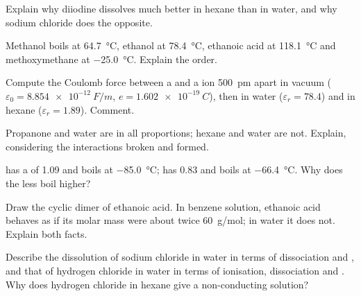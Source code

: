 \begin{exercise}[$\star$]\label{exo:b1:intermolecular-forces-solvents:4}
Explain why diiodine dissolves much better in hexane than in water, and
why sodium chloride does the opposite.
\end{exercise}

\begin{exercise}[$\star\star$]\label{exo:b1:intermolecular-forces-solvents:5}
Methanol boils at \qty{64.7}{\celsius}, ethanol at \qty{78.4}{\celsius},
ethanoic acid at \qty{118.1}{\celsius} and methoxymethane at
\qty{-25.0}{\celsius}. Explain the order.
\end{exercise}

\begin{exercise}[$\star\star$]\label{exo:b1:intermolecular-forces-solvents:6}
Compute the Coulomb force between a  and a  ion
\qty{500}{pm} apart in vacuum ($\varepsilon_0 = \qty{8.854e-12}{F/m}$,
$e = \qty{1.602e-19}{C}$), then in water ($\varepsilon_r = 78.4$) and in
hexane ($\varepsilon_r = 1.89$). Comment.
\end{exercise}

\begin{exercise}[$\star\star$]\label{exo:b1:intermolecular-forces-solvents:7}
Propanone and water are  in all proportions; hexane and water are
not. Explain, considering the interactions broken and formed.
\end{exercise}

\begin{exercise}[$\star\star$]\label{exo:b1:intermolecular-forces-solvents:8}
 has a  of \qty{1.09}{\debye} and boils at
\qty{-85.0}{\celsius};  has \qty{0.83}{\debye} and boils at
\qty{-66.4}{\celsius}. Why does the less  boil higher?
\end{exercise}

\begin{exercise}[$\star\star$]\label{exo:b1:intermolecular-forces-solvents:9}
Draw the cyclic dimer of ethanoic acid. In benzene solution, ethanoic
acid behaves as if its molar mass were about twice \qty{60}{g/mol}; in
water it does not. Explain both facts.
\end{exercise}

\begin{exercise}[$\star\star\star$]\label{exo:b1:intermolecular-forces-solvents:10}
Describe the dissolution of sodium chloride in water in terms of
dissociation and , and that of hydrogen chloride in water in
terms of ionisation, dissociation and . Why does hydrogen
chloride in hexane give a non-conducting solution?
\end{exercise}

